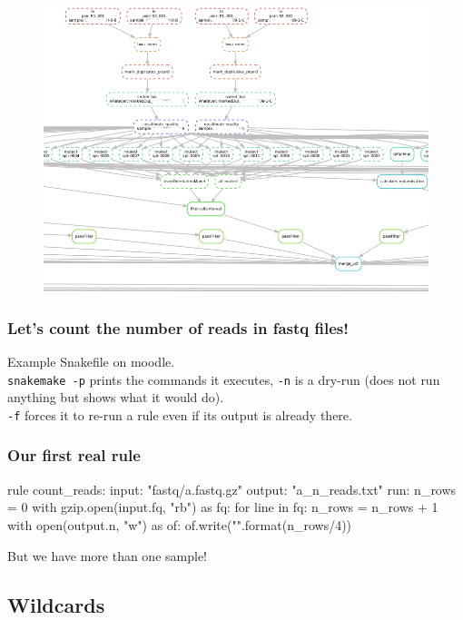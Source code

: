 \documentclass[xcolor=table]{beamer}
\begin{document}
\begin{frame}
\begin{figure}\includegraphics[width=1\textwidth]{./img/dag.png}\end{figure}
\end{frame}

\begin{frame}
\frametitle{Let's count the number of reads in fastq files!}
Example Snakefile on moodle. \\

\texttt{snakemake -p} prints the commands it executes, \texttt{-n} is a dry-run (does not run anything but shows what it would do).
\\
\texttt{-f} forces it to re-run a rule even if its output is already there.
\end{frame}

\begin{frame}[fragile]
\frametitle{Our first real rule}
\begin{python}
rule count_reads:
	input: "fastq/a.fastq.gz"
	output: "a_n_reads.txt"
	run: 
		n_rows = 0
		with gzip.open(input.fq, "rb") as fq:
		    for line in fq:
		        n_rows = n_rows + 1
		with open(output.n, "w") as of:
		    of.write("{}\n".format(n_rows/4))

\end{python}
But we have more than one sample!
\end{frame}

\subsection{Wildcards}
\end{document}
